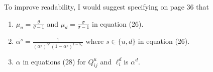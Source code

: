 \documentclass{homeworg}
\begin{document}
To improve readability, I would suggest specifying on page 36 that

\begin{enumerate}[ref=Step \arabic{enumi}, wide=0pt]

\item $\mu_u = \frac{\theta}{\theta-1}$ and $\mu_d = \frac{\sigma}{\sigma-1}$ in equation (26).

\item $\bar{\alpha^{s}} = \frac{1}{(\alpha^{s})^{\alpha^{s}}(1-\alpha^{s})^{1-\alpha_s}}$ where $s \in \{u, d\}$ in equation (26).

\item $\alpha$ in equations (28) for $Q^{u}_{ij}$ and $\ell^{d}_{i}$is $\alpha^{d}$.

\end{enumerate}
\end{document}

